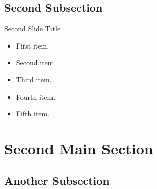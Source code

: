 \documentclass{beamer}
\begin{document}
          \subsection{Second Subsection}
                              																
          \begin{frame}{Second Slide Title}
            \begin{itemize}
              \item {
                  First item.
                  \pause %
                }
                \item {   
                    Second item.
                  }
                  \item<3-> {
                    Third item.
                  }
                  \item<4-> {
                    Fourth item.
                  }
                  \item<5-> {
                    Fifth item. 
                  }
                \end{itemize}
              \end{frame}
                                          																						
              \section{Second Main Section}
                                          																						
              \subsection{Another Subsection}
                                          																						
\end{document}
